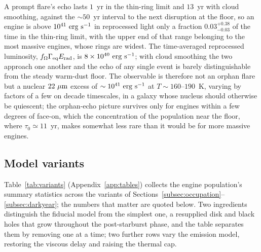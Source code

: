 \documentclass[twocolumn,pdftex]{aastex701}
\newcommand{\gameq}{\Gamma_{\rm eq}\xspace}
\newcommand{\fom}{f_{\Omega}\xspace}
\newcommand{\um}{\mu{\rm m}\xspace}
\begin{document}
A prompt flare's echo lasts $1$~yr in the thin-ring limit and $13$~yr with cloud smoothing, against the $\sim 50$~yr interval to the next disruption at the floor, so an engine is above $10^{41}~{\rm erg~s^{-1}}$ in reprocessed light only a fraction $0.03^{+0.38}_{-0.03}$ of the time in the thin-ring limit, with the upper end of that range belonging to the most massive engines, whose rings are widest. The time-averaged reprocessed luminosity, $\fom \gameq E_{\rm rad}$, is $8 \times 10^{40}~{\rm erg~s^{-1}}$; with cloud smoothing the two approach one another and the echo of any single event is barely distinguishable from the steady warm-dust floor. The observable is therefore not an orphan flare but a nuclear $22~\um$ excess of $\sim 10^{41}~{\rm erg~s^{-1}}$ at $T \sim 160$--$190$~K, varying by factors of a few on decade timescales, in a galaxy whose nucleus should otherwise be quiescent; the orphan-echo picture survives only for engines within a few degrees of face-on, which the concentration of the population near the floor, where $\tau_{0} \simeq 11$~yr, makes somewhat less rare than it would be for more massive engines.

\subsection{Model variants}\label{subsec:variants}

Table~\ref{tab:variants} (Appendix~\ref{app:tables}) collects the engine population's summary statistics across the variants of Sections~\ref{subsec:occupation}--\ref{subsec:darkyear}; the numbers that matter are quoted below. Two ingredients distinguish the fiducial model from the simplest one, a resupplied disk and black holes that grow throughout the post-starburst phase, and the table separates them by removing one at a time; two further rows vary the emission model, restoring the viscous delay and raising the thermal cap.
\end{document}
